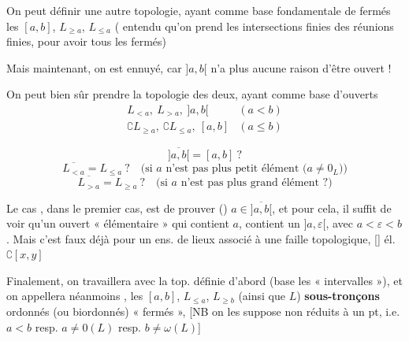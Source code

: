 \documentclass[11pt,a4paper]{article}
\begin{document}
On peut définir une autre topologie, ayant comme base fondamentale de fermés les $[a,b]$, $L_{\geq a}$, $L_{\leq a}$ ( entendu qu'on prend les intersections finies des réunions finies, pour avoir tous les fermés)

Mais maintenant, on est ennuyé, car $]a,b[$ n'a plus aucune raison d'être ouvert !

 On peut bien sûr prendre la topologie  des deux, ayant comme base d'ouverts
\[
  \begin{array}{ll}
    L_{<a},\ L_{>a},\ ]a,b[ & (a < b) \\
    \complement L_{\geq a},\ \complement L_{\leq a},\ [a,b] & (a \leq b)
  \end{array}
\]

\struck{Dire que $]a,b[$ est \ill{}}    \struck{Avec \ill{} $b \in [a,b$}
\[
  \overline{]a,b[} = [a,b] \ ?
\]
\[
  \overline{L_{<a}} = L_{\leq a} \ ? \quad \text{(si $a$ n'est pas plus petit élément ($a \neq 0_L$))}
\]
\[
  \overline{L_{>a}} = L_{\geq a} \ ? \quad \text{(si $a$ n'est pas plus grand élément ?)}
\]

 Le cas , dans le premier cas, est de prouver () $a \in \overline{]a,b[}$, et pour cela, il suffit de voir  qu'un ouvert « élémentaire » qui contient $a$, contient un $]a, \varepsilon[$, avec $a < \varepsilon < b$. Mais c'est faux déjà pour un ens. de lieux associé à une faille topologique,  [] él. $\complement[x,y]$

\marginal{\ill{} \ill{} que $a \in \complement\,[x,y]$ mais $]a,b[ \subset [x,y]$}

Finalement, on travaillera avec la top. définie d'abord (base  \ill{} les « intervalles »), et on appellera néanmoins , les $[a,b]$, $L_{\leq a}$, $L_{\geq b}$ (ainsi que $L$) \textbf{sous-tronçons} ordonnés (ou biordonnés) « fermés », [NB on les suppose non réduits à un pt, i.e. $a < b$ resp. $a \neq 0(L)$ resp. $b \neq \omega(L)$]
\end{document}
